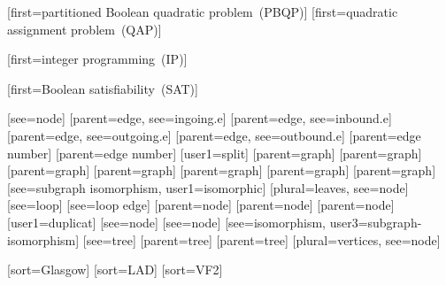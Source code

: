 %
        [first={partitioned Boolean quadratic problem~(PBQP)}]
%
        [first={quadratic assignment problem~(QAP)}]

%
        [first={integer programming~(IP)}]

%
        [first={Boolean satisfiability~(SAT)}]

[see={node}]
[parent={edge}, see={ingoing.e}]
[parent={edge}, see={inbound.e}]
[parent={edge}, see={outgoing.e}]
[parent={edge}, see={outbound.e}]
[parent={edge number}]
[parent={edge number}]
[user1={split}]
[parent={graph}]
[parent={graph}]
[parent={graph}]
[parent={graph}]
[parent={graph}]
[parent={graph}]
[parent={graph}]
[see={subgraph isomorphism}, user1={isomorphic}]
[plural={leaves}, see={node}]
[see={loop}]
[see={loop edge}]
[parent={node}]
[parent={node}]
[parent={node}]
[user1={duplicat}]%
[see={node}]
[see={node}]
[see={isomorphism}, user3={subgraph-isomorphism}]
[see={tree}]
[parent={tree}]
[parent={tree}]
[plural={vertices}, see={node}]

[sort={Glasgow}]
[sort={LAD}]
[sort={VF2}]


